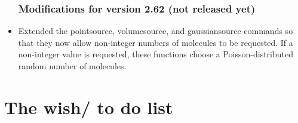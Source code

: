 \documentclass {book}
\begin{document}
\begin{itemize}
\subsection*{Modifications for version 2.62 (not released yet)}
\item Extended the pointsource, volumesource, and gaussiansource commands so that they now allow non-integer numbers of molecules to be requested. If a non-integer value is requested, these functions choose a Poisson-distributed random number of molecules.

\end{itemize}


\chapter{The wish/ to do list}

\end{document}
